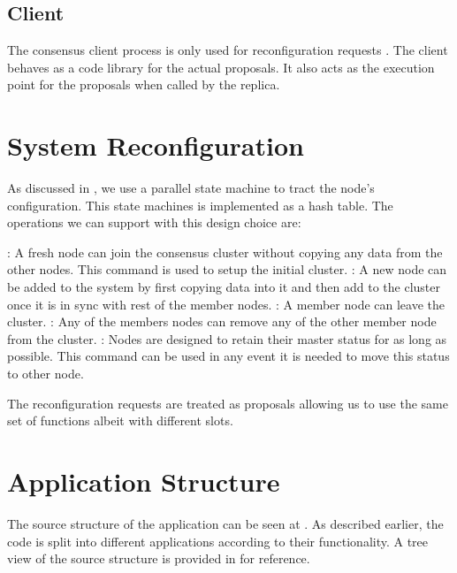 \subsection{Client}

The consensus client process is only used for reconfiguration requests
. The client behaves as a code library for the actual
proposals. It also acts as the execution point for the proposals when called
by the replica.

\section{System Reconfiguration}
\label{section:impl.rcfg}

As discussed in , we use a parallel state machine
to tract the node's configuration. This state machines is implemented as a
hash table. The operations we can support with this design choice are:

\begin{itemize}
    : A fresh node can join the consensus cluster without copying
    any data from the other nodes. This command is used to setup the initial
    cluster.
    : A new node can be added to the system by first
    copying data into it and then add to the cluster once it is in sync with
    rest of the member nodes.
    : A member node can leave the cluster.
    : Any of the members nodes can remove any of the other member
    node from the cluster.
    : Nodes are designed to retain their master status
    for as long as possible. This command can be used in any event it is needed
    to move this status to other node.
\end{itemize}

The reconfiguration requests are treated as proposals allowing us to use the
same set of functions albeit with different slots.

\section{Application Structure}

The source structure of the application can be seen at 
.
As described earlier, the code is split into different applications according
to their functionality. A tree view of the source structure is provided in
 for reference.

